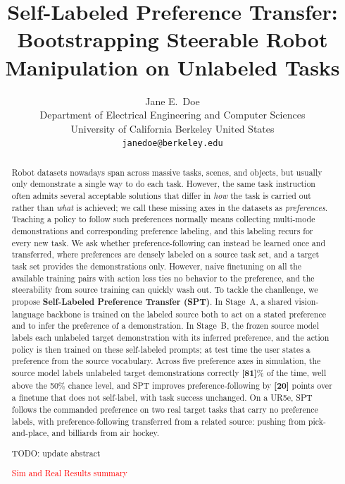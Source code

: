 \documentclass{article}
\title{Self-Labeled Preference Transfer: Bootstrapping Steerable Robot Manipulation on Unlabeled Tasks}
\author{
  Jane E.~Doe\\
  Department of Electrical Engineering and Computer Sciences\\
  University of California Berkeley
  United States\\
  \texttt{janedoe@berkeley.edu}
}
\newcommand{\YZ}[1]{{\color{blue}#1}}
\begin{document}
\maketitle


\begin{abstract}
Robot datasets nowadays span across massive tasks, scenes, and objects, but usually only demonstrate a single way to do each task.
However, the same task instruction often admits several acceptable solutions that differ in \emph{how} the task is carried out rather than \emph{what} is achieved; we call these missing axes in the datasets as \emph{preferences}.
Teaching a policy to follow such preferences normally means collecting multi-mode demonstrations and corresponding preference labeling, and this labeling recurs for every new task.
We ask whether preference-following can instead be learned once and transferred, where preferences are densely labeled on a source task set, and a target task set provides the demonstrations only.
However, naive finetuning on all the available training pairs with action loss ties no behavior to the preference, and the steerability from source training can quickly wash out.
To tackle the chanllenge, we propose \textbf{Self-Labeled Preference Transfer (SPT)}.
In Stage~A, a shared vision-language backbone is trained on the labeled source both to act on a stated preference and to infer the preference of a demonstration.
In Stage~B, the frozen source model labels each unlabeled target demonstration with its inferred preference, and the action policy is then trained on these self-labeled prompts; at test time the user states a preference from the source vocabulary.
Across five preference axes in simulation, the source model labels unlabeled target demonstrations correctly \textbf{[81]}\% of the time, well above the 50\% chance level, and SPT improves preference-following by \textbf{[20]} points over a finetune that does not self-label, with task success unchanged.
On a UR5e, SPT follows the commanded preference on two real target tasks that carry no preference labels, with preference-following transferred from a related source: pushing from pick-and-place, and billiards from air hockey.

\YZ{TODO: update abstract}

\textcolor{red}{Sim and Real Results summary}

\end{abstract}
\end{document}
